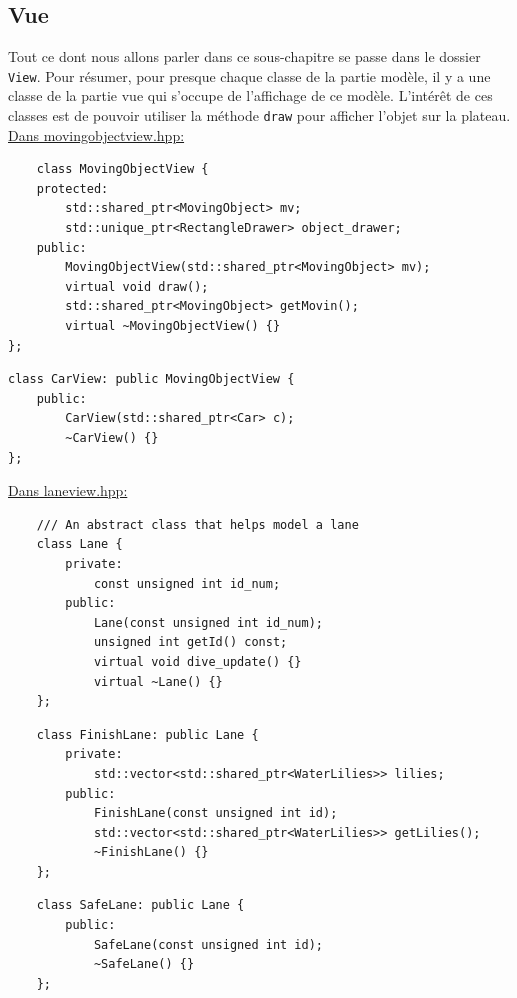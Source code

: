 \documentclass[a4paper, 12pt]{article}
\begin{document}
\subsection{Vue}

Tout ce dont nous allons parler dans ce sous-chapitre se passe dans le dossier \texttt{View}. Pour résumer, pour presque chaque classe de la partie modèle, il y a une classe de la partie vue qui s'occupe de l'affichage de ce modèle.
L'intérêt de ces classes est de pouvoir utiliser la méthode \texttt{draw} pour afficher l'objet sur la plateau. \\

\underline{Dans movingobjectview.hpp:} \hspace{0.5cm}

\begin{lstlisting}
    class MovingObjectView {
    protected:
        std::shared_ptr<MovingObject> mv;
        std::unique_ptr<RectangleDrawer> object_drawer;
    public:
        MovingObjectView(std::shared_ptr<MovingObject> mv);
        virtual void draw();
        std::shared_ptr<MovingObject> getMovin();
        virtual ~MovingObjectView() {}
};
\end{lstlisting}

\begin{lstlisting}
class CarView: public MovingObjectView {
    public:
        CarView(std::shared_ptr<Car> c);
        ~CarView() {}
};
\end{lstlisting}

\underline{Dans laneview.hpp:} \hspace{0.5cm}

\begin{lstlisting}
    /// An abstract class that helps model a lane
    class Lane {
        private:
            const unsigned int id_num;
        public:
            Lane(const unsigned int id_num);
            unsigned int getId() const;
            virtual void dive_update() {}
            virtual ~Lane() {}
    };
\end{lstlisting}

\begin{lstlisting}
    class FinishLane: public Lane {
        private:
            std::vector<std::shared_ptr<WaterLilies>> lilies;
        public:
            FinishLane(const unsigned int id);
            std::vector<std::shared_ptr<WaterLilies>> getLilies();
            ~FinishLane() {}
    };
\end{lstlisting}

\begin{lstlisting}
    class SafeLane: public Lane {
        public:
            SafeLane(const unsigned int id);
            ~SafeLane() {}
    };
\end{lstlisting}
\end{document}
